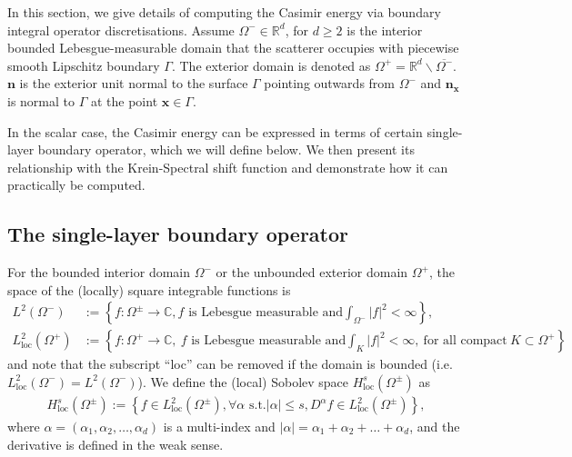 
In this section, we give details of computing the Casimir energy via boundary integral operator discretisations. 
Assume 
$\Omega^{-}\in\mathbb{R}^{d}$, for $d \geq 2$ is the interior bounded Lebesgue-measurable domain that the scatterer occupies with piecewise smooth Lipschitz boundary $\Gamma$. The exterior domain is denoted as 
$\Omega^{+} = \mathbb{R}^{d}\backslash\overline{\Omega^{-}}$. $\boldsymbol{n}$ is the exterior unit normal to the surface $\Gamma$ pointing outwards from $\Omega^{-}$ and 
$\boldsymbol{n}_{\boldsymbol{x}}$ is normal to $\Gamma$ at the point $\boldsymbol{x}\in\Gamma$.

In the scalar case, the Casimir energy can be expressed in terms of certain single-layer boundary operator, which we will define below. We then present its relationship with the Krein-Spectral shift function and demonstrate how it can practically be computed.

\subsection{The single-layer boundary operator}
For the bounded interior domain $\Omega^{-}$ or the unbounded exterior domain $\Omega^{+}$, the space of the (locally) square integrable functions is 
\begin{align*}
    L^{2}(\Omega^{-}) &:= \left\{f:\Omega^{\pm}\rightarrow\mathbb{C}, f \text{ is Lebesgue measurable and} \int_{\Omega^{-}}|f|^{2} < \infty \right\},\\
    L_{\text{loc}}^{2}(\Omega^{+}) &:= \left\{f:\Omega^{+}\rightarrow\mathbb{C},\ f \text{ is Lebesgue measurable and} \int_{K}|f|^{2} < \infty, \ \text{for all compact}\ K \subset \Omega^{+} \right\}
\end{align*}
and note that the subscript ``loc'' can be removed if the domain is bounded (i.e. $L_{\text{loc}}^{2}(\Omega^{-}) = L^{2}(\Omega^{-})$).
We define the (local) Sobolev space $H_{\text{loc}}^{s}(\Omega^{\pm})$ as 
\begin{align*}
    H_{\text{loc}}^{s}(\Omega^{\pm}):=\left\{f\in L_{\text{loc}}^{2}(\Omega^{\pm}), \forall\alpha \text{ s.t.} |\alpha|\leq s, D^{\alpha}f\in L_{\text{loc}}^{2}(\Omega^{\pm})\right\},
\end{align*}
where $\alpha = (\alpha_{1}, \alpha_{2}, \dots, \alpha_{d})$ is a multi-index and $|\alpha| = \alpha_{1} + \alpha_{2} + \dots + \alpha_{d}$, and 
the derivative is defined in the weak sense.

